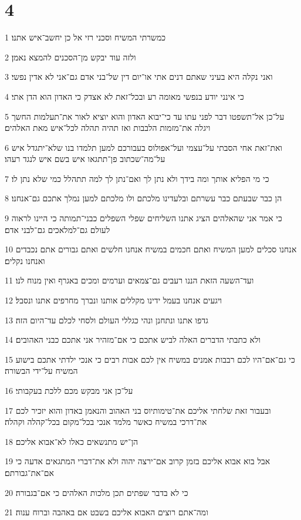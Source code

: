 \chapter{4}

\par 1 כמשרתי המשיח וסכני רזי אל כן יחשב־איש אתנו׃
\par 2 ולזה עוד יבקש מן־הסכנים להמצא נאמן׃
\par 3 ואני נקלה היא בעיני שאתם דנים אתי או־יום דין של־בני אדם גם־אני לא אדין נפשי׃
\par 4 כי אינני יודע בנפשי מאומה רע ובכל־זאת לא אצדק כי האדון הוא הדן אתי׃
\par 5 על־כן אל־תשפטו דבר לפני עתו עד כי־יבוא האדון והוא יוציא לאור את־תעלמות החשך ויגלה את־מזמות הלבבות ואז תהיה תהלה לכל־איש מאת האלהים׃
\par 6 ואת־זאת אחי הסבתי על־עצמי ועל־אפולוס בעבורכם למען תלמדו בנו שלא־יתגדל איש על־מה־שכתוב פן־תתגאו איש בשם איש לנגד רעהו׃
\par 7 כי מי הפליא אותך ומה בידך ולא נתן לך ואם־נתן לך למה תתהלל כמי שלא נתן לו׃
\par 8 הן כבר שבעתם כבר עשרתם ובלעדינו מלכתם ולו מלכתם למען נמלך אתכם גם־אנחנו׃
\par 9 כי אמר אני שהאלהים הציג אתנו השליחים שפלי השפלים כבני־תמותה כי היינו לראוה לעולם גם־למלאכים גם־לבני אדם׃
\par 10 אנחנו סכלים למען המשיח ואתם חכמים במשיח אנחנו חלשים ואתם גבורים אתם נכבדים ואנחנו נקלים׃
\par 11 ועד־השעה הזאת הננו רעבים גם־צמאים וערמים ומכים באגרף ואין מנוח לנו׃
\par 12 ויגעים אנחנו בעמל ידינו מקללים אותנו ונברך מחרפים אתנו ונסבל׃
\par 13 גדפו אתנו ונתחנן ונהי כגללי העולם ולסחי לכלם עד־היום הזה׃
\par 14 ולא כתבתי הדברים האלה לביש אתכם כי אם־מזהיר אני אתכם כבני האהובים׃
\par 15 כי גם־אם־היו לכם רבבות אמנים במשיח אין לכם אבות רבים כי אנכי ילדתי אתכם בישוע המשיח על־ידי הבשורה׃
\par 16 על־כן אני מבקש מכם ללכת בעקבותי׃
\par 17 ובעבור זאת שלחתי אליכם את־טימותיוס בני האהוב והנאמן באדון והוא יזכיר לכם את־דרכי במשיח כאשר מלמד אנכי בכל־מקום בכל־קהלה וקהלה׃
\par 18 הן־יש מתנשאים כאלו לא־אבוא אליכם׃
\par 19 אבל בוא אבוא אליכם בזמן קרוב אם־ירצה יהוה ולא את־דברי המתגאים אדעה כי אם־את־גבורתם׃
\par 20 כי לא בדבר שפתים תכן מלכות האלהים כי אם־בגבורה׃
\par 21 ומה־אתם רוצים האבוא אליכם בשבט אם באהבה וברוח ענוה׃

